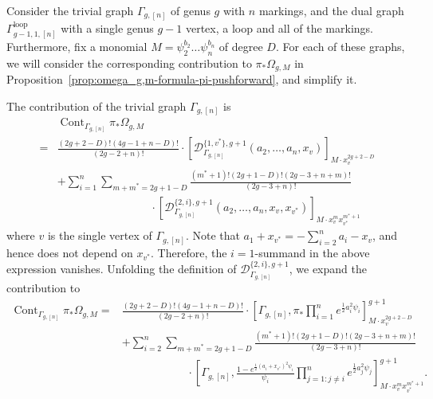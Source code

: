 \documentclass[12pt,reqno]{amsart}
\DeclareMathOperator{\Cont}{Cont}
\newcommand{\Gammaloop}{\Gamma^\mathrm{loop}}
\theoremstyle{plain}
\theoremstyle{definition}
\theoremstyle{remark}
\begin{document}
Consider the trivial graph $\Gamma_{g,[n]}$ of genus $g$ with $n$ markings, and the dual graph $\Gammaloop_{g-1, 1, [n]}$ with a single genus $g-1$ vertex, a loop and all of the markings.
Furthermore, fix a monomial $M = \psi_2^{b_2} \dots \psi_n^{b_n}$ of degree $D$.
For each of these graphs, we will consider the corresponding contribution to $\pi_* \Omega_{g, M}$ in Proposition~\ref{prop:omega_g,m-formula-pi-pushforward}, and simplify it.

The contribution of the trivial graph $\Gamma_{g,[n]}$ is
\begin{align*}
 &\Cont_{\Gamma_{g,[n]}}\pi_*\Omega_{g,M}\\= & \frac{(2g + 2 - D)!(4g - 1 + n - D)!}{(2g - 2 + n)!} \cdot [\mathcal{D}^{\{1,v^*\}, g+1}_{\Gamma_{g, [n]}}(a_2, \dotsc, a_n, x_v)]_{M \cdot x_v^{2g + 2 - D}} \\
  &+\sum_{i=1}^{n}\sum_{m + m^* = 2g + 1 - D}\frac{(m^* + 1)!(2g + 1 - D)!(2g - 3 + n + m)!}{(2g - 3 + n)!}
\\&\hspace{100pt}\cdot  [\mathcal{D}^{\{2,i\}, g+1}_{\Gamma_{g, [n]}}(a_2, \dotsc, a_n, x_v, x_{v^*})]_{M \cdot x_v^m x_{v^*}^{m^* + 1}}
\end{align*}
where $v$ is the single vertex of $\Gamma_{g,[n]}$.
Note that $a_1 + x_{v^*} = -\sum_{i = 2}^n a_i - x_v$, and hence does not depend on $x_{v^*}$.
Therefore, the $i = 1$-summand in the above expression vanishes.
Unfolding the definition of $\mathcal{D}^{\{2,i\}, g+1}_{\Gamma_{g, [n]}}$, we expand the contribution to
\begin{align}\label{eqn:cont-g-[n]}
\Cont_{\Gamma_{g,[n]}}\pi_*\Omega_{g,M}=&\frac{(2g + 2 - D)!(4g - 1 + n - D)!}{(2g - 2 + n)!} \cdot 
    \left[\Gamma_{g, [n]}, \pi_* \prod_{i=1}^{n} e^{\frac{1}{2} a_i^2\psi_i}\right]^{g + 1}_{M \cdot x_v^{2g + 2 - D}} \nonumber
    \\&+ \sum_{i=2}^{n}\sum_{m + m^* = 2g + 1 - D}\frac{(m^* + 1)!(2g + 1 - D)!(2g - 3 + n + m)!}{(2g - 3 + n)!}
\nonumber\\&\hspace{70pt}\cdot\left[\Gamma_{g, [n]}, \frac{1-e^{\frac{1}{2}(a_i+x_{v^*})^2\psi_i}}{\psi_i}\prod_{j=1: j\neq i}^n e^{\frac 12 a_j^2\psi_j}\right]^{g + 1}_{M \cdot x_v^m x_{v^*}^{m^* + 1}}.
\end{align}
\end{document}
